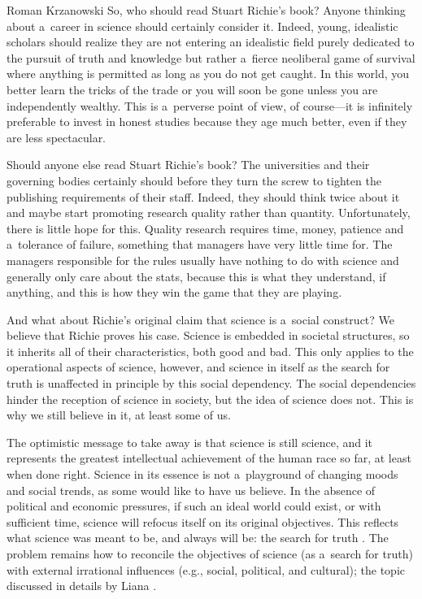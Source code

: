 \begin{newrevengenv}{Roman Krzanowski}
So, who should read Stuart Richie's book? Anyone thinking about a~career in science should certainly consider it. Indeed, young, idealistic scholars should realize they are not entering an idealistic field purely dedicated to the pursuit of truth and knowledge but rather a~fierce neoliberal game of survival where anything is permitted as long as you do not get caught. In this world, you better learn the tricks of the trade or you will soon be gone unless you are independently wealthy. This is a~perverse point of view, of course—it is infinitely preferable to invest in honest studies because they age much better, even if they are less spectacular.

Should anyone else read Stuart Richie's book? The universities and their governing bodies certainly should before they turn the screw to tighten the publishing requirements of their staff. Indeed, they should think twice about it and maybe start promoting research quality rather than quantity. Unfortunately, there is little hope for this. Quality research requires time, money, patience and a~tolerance of failure, something that managers have very little time for. The managers responsible for the rules usually have nothing to do with science and generally only care about the stats, because this is what they understand, if anything, and this is how they win the game that they are playing.

And what about Richie's original claim that science is a~social construct? We believe that Richie proves his case. Science is embedded in societal structures, so it inherits all of their characteristics, both good and bad. This only applies to the operational aspects of science, however, and science in itself as the search for truth is unaffected in principle by this social dependency. The social dependencies hinder the reception of science in society, but the idea of science does not. This is why we still believe in it, at least some of us.

The optimistic message to take away is that science is still science, and it represents the greatest intellectual achievement of the human race so far, at least when done right. Science in its essence is not a~playground of changing moods and social trends, as some would like to have us believe. In the absence of political and economic pressures, if such an ideal world could exist, or with sufficient time, science will refocus itself on its original objectives. This reflects what science was meant to be, and always will be: the search for truth
\parencite[e.g.][]{grayling_frontiers_2022}. %
 The problem remains how to reconcile the objectives of science (as a~search for truth) with external irrational influences (e.g., social, political, and cultural); the topic discussed in details by Liana 
\parencites*[][]{liana_nauka_2019}[][]{liana_jozefa_2020}.%





\end{newrevengenv}
